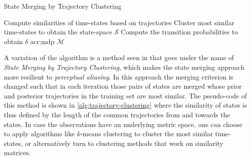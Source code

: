 \begin{algorithm}[t]
	\caption{State Merging by Trajectory Clustering}
	\label{alg:trajectory-clustering}
	\begin{algorithmic}[1]
		 
		\State Compute similarities of time-states based on trajectories
		\State Cluster most similar time-states to obtain the state-space $\mathcal{S}$
		\State Compute the transition probabilities to obtain $\delta$
		\State \Return \acrshort{acr:mdp} $\mathcal{M}$
	\end{algorithmic}
\end{algorithm}

A variation of the algorithm is a method seen in \cite{nikovski1999learning} that goes under the name of \textit{State Merging by Trajectory Clustering}, which makes the state merging approach more resilient to \textit{perceptual aliasing}.
In this approach the merging criterion is changed such that in each iteration those pairs of states are merged whose prior and posterior trajectories in the training set are most similar.
The pseudo-code of this method is shown in \autoref{alg:trajectory-clustering} where the similarity of states is thus defined by the length of the common trajectories from and towards the states. 
In case the observations have an underlying metric space, one can choose to apply algorithms like $k$-means clustering to cluster the most similar time-states, or alternatively turn to clustering methods that work on similarity matrices.



%
%


